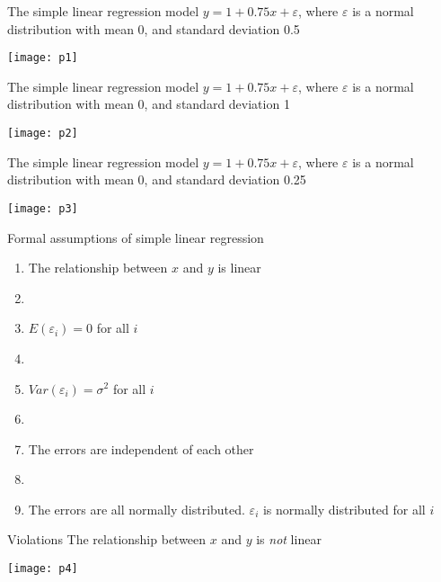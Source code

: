 \documentclass[xcolor=dvipsnames]{beamer}
\begin{document}
\begin{frame}{The simple linear regression model}
	$y = 1 + 0.75x + \varepsilon$, where $\varepsilon$ is a normal distribution with mean 0, and standard deviation 0.5 \pause
	\begin{center}
		\texttt{[image: p1]}
	\end{center}
\end{frame}

\begin{frame}{The simple linear regression model}
$y = 1 + 0.75x + \varepsilon$, where $\varepsilon$ is a normal distribution with mean 0, and standard deviation 1 \pause
\begin{center}
	\texttt{[image: p2]}
\end{center}
\end{frame}

\begin{frame}{The simple linear regression model}
$y = 1 + 0.75x + \varepsilon$, where $\varepsilon$ is a normal distribution with mean 0, and standard deviation 0.25 \pause
\begin{center}
	\texttt{[image: p3]}
\end{center}
\end{frame}

\begin{frame}{Formal assumptions of simple linear regression}
	\begin{enumerate}
		\item The relationship between $x$ and $y$ is linear \pause
		\item[]
		\item $E(\varepsilon_i) = 0$ for all $i$ \pause
		\item[]
		\item $Var(\varepsilon_i) = \sigma^2$ for all $i$ \pause
		\item[]
		\item The errors are independent of each other \pause
		\item[]
		\item The errors are all normally distributed. $\varepsilon_i$ is normally distributed for all $i$
	\end{enumerate}
\end{frame}

\begin{frame}{Violations}
The relationship between $x$ and $y$ is \emph{not} linear 
\begin{center}
	\texttt{[image: p4]}
\end{center}
\end{frame}
\end{document}
